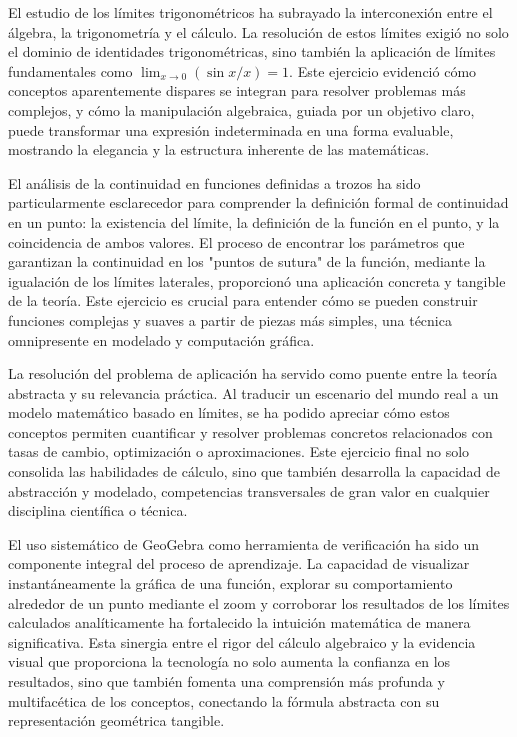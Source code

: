 \documentclass{article}
\begin{document}
El estudio de los límites trigonométricos ha subrayado la interconexión entre el álgebra, la trigonometría y el cálculo. La resolución de estos límites exigió no solo el dominio de identidades trigonométricas, sino también la aplicación de límites fundamentales como $\lim_{x\to 0} (\sin x / x) = 1$. Este ejercicio evidenció cómo conceptos aparentemente dispares se integran para resolver problemas más complejos, y cómo la manipulación algebraica, guiada por un objetivo claro, puede transformar una expresión indeterminada en una forma evaluable, mostrando la elegancia y la estructura inherente de las matemáticas.

El análisis de la continuidad en funciones definidas a trozos ha sido particularmente esclarecedor para comprender la definición formal de continuidad en un punto: la existencia del límite, la definición de la función en el punto, y la coincidencia de ambos valores. El proceso de encontrar los parámetros que garantizan la continuidad en los "puntos de sutura" de la función, mediante la igualación de los límites laterales, proporcionó una aplicación concreta y tangible de la teoría. Este ejercicio es crucial para entender cómo se pueden construir funciones complejas y suaves a partir de piezas más simples, una técnica omnipresente en modelado y computación gráfica.

La resolución del problema de aplicación ha servido como puente entre la teoría abstracta y su relevancia práctica. Al traducir un escenario del mundo real a un modelo matemático basado en límites, se ha podido apreciar cómo estos conceptos permiten cuantificar y resolver problemas concretos relacionados con tasas de cambio, optimización o aproximaciones. Este ejercicio final no solo consolida las habilidades de cálculo, sino que también desarrolla la capacidad de abstracción y modelado, competencias transversales de gran valor en cualquier disciplina científica o técnica.

El uso sistemático de GeoGebra como herramienta de verificación ha sido un componente integral del proceso de aprendizaje. La capacidad de visualizar instantáneamente la gráfica de una función, explorar su comportamiento alrededor de un punto mediante el zoom y corroborar los resultados de los límites calculados analíticamente ha fortalecido la intuición matemática de manera significativa. Esta sinergia entre el rigor del cálculo algebraico y la evidencia visual que proporciona la tecnología no solo aumenta la confianza en los resultados, sino que también fomenta una comprensión más profunda y multifacética de los conceptos, conectando la fórmula abstracta con su representación geométrica tangible.
\end{document}
